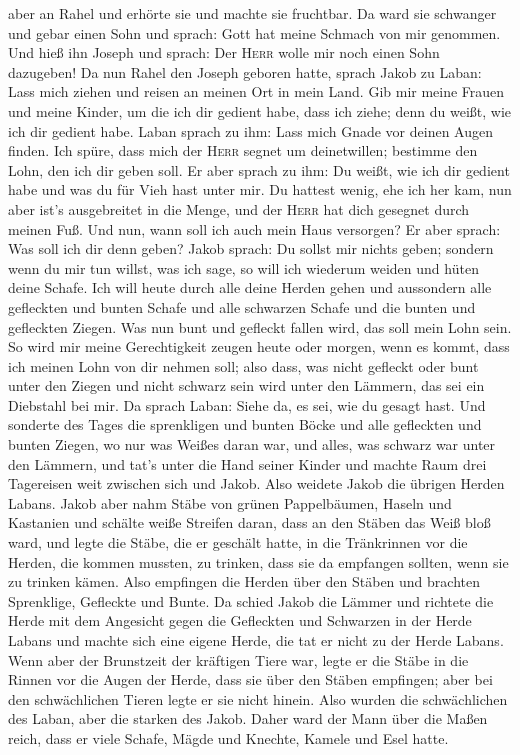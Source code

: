 aber an Rahel und erhörte sie und machte sie fruchtbar. 
Da ward sie schwanger und gebar einen Sohn und sprach: Gott hat meine
Schmach von mir genommen.  Und hieß ihn Joseph und
sprach: Der \textsc{Herr} wolle mir noch einen Sohn dazugeben!
 Da nun Rahel den Joseph geboren hatte, sprach Jakob zu
Laban: Lass mich ziehen und reisen an meinen Ort in mein Land.
 Gib mir meine Frauen und meine Kinder, um die ich dir
gedient habe, dass ich ziehe; denn du weißt, wie ich dir gedient habe.
 Laban sprach zu ihm: Lass mich Gnade vor deinen Augen
finden. Ich spüre, dass mich der \textsc{Herr} segnet um deinetwillen;
 bestimme den Lohn, den ich dir geben soll.
 Er aber sprach zu ihm: Du weißt, wie ich dir gedient
habe und was du für Vieh hast unter mir.  Du hattest
wenig, ehe ich her kam, nun aber ist's ausgebreitet in die Menge, und
der \textsc{Herr} hat dich gesegnet durch meinen Fuß. Und nun, wann soll
ich auch mein Haus versorgen?  Er aber sprach: Was soll
ich dir denn geben? Jakob sprach: Du sollst mir nichts geben; sondern
wenn du mir tun willst, was ich sage, so will ich wiederum weiden und
hüten deine Schafe.  Ich will heute durch alle deine
Herden gehen und aussondern alle gefleckten und bunten Schafe und alle
schwarzen Schafe und die bunten und gefleckten Ziegen. Was nun bunt und
gefleckt fallen wird, das soll mein Lohn sein.  So wird
mir meine Gerechtigkeit zeugen heute oder morgen, wenn es kommt, dass
ich meinen Lohn von dir nehmen soll; also dass, was nicht gefleckt oder
bunt unter den Ziegen und nicht schwarz sein wird unter den Lämmern, das
sei ein Diebstahl bei mir.  Da sprach Laban: Siehe da, es
sei, wie du gesagt hast.  Und sonderte des Tages die
sprenkligen und bunten Böcke und alle gefleckten und bunten Ziegen, wo
nur was Weißes daran war, und alles, was schwarz war unter den Lämmern,
und tat's unter die Hand seiner Kinder  und machte Raum
drei Tagereisen weit zwischen sich und Jakob. Also weidete Jakob die
übrigen Herden Labans.  Jakob aber nahm Stäbe von grünen
Pappelbäumen, Haseln und Kastanien und schälte weiße Streifen daran,
dass an den Stäben das Weiß bloß ward,  und legte die
Stäbe, die er geschält hatte, in die Tränkrinnen vor die Herden, die
kommen mussten, zu trinken, dass sie da empfangen sollten, wenn sie zu
trinken kämen.  Also empfingen die Herden über den Stäben
und brachten Sprenklige, Gefleckte und Bunte.  Da schied
Jakob die Lämmer und richtete die Herde mit dem Angesicht gegen die
Gefleckten und Schwarzen in der Herde Labans und machte sich eine eigene
Herde, die tat er nicht zu der Herde Labans.  Wenn aber
der Brunstzeit der kräftigen Tiere war, legte er die Stäbe in die Rinnen
vor die Augen der Herde, dass sie über den Stäben empfingen;
 aber bei den schwächlichen Tieren legte er sie nicht
hinein. Also wurden die schwächlichen des Laban, aber die starken des
Jakob.  Daher ward der Mann über die Maßen reich, dass er
viele Schafe, Mägde und Knechte, Kamele und Esel hatte.

